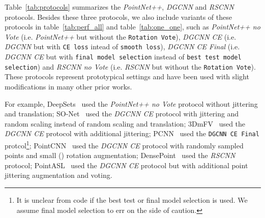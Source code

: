 \documentclass{article}
\begin{document}
Table~\ref{tab:protocols} summarizes the \textit{PointNet++}, \textit{DGCNN} and \textit{RSCNN} protocols. Besides these three protocols, we also include variants of these protocols in table~\ref{tab:perf_all} and table~\ref{tab:one_one}, such as \textit{PointNet++ no Vote} (i.e. \textit{PointNet++} but without the \texttt{Rotation Vote}), \textit{DGCNN CE} (i.e. \textit{DGCNN} but with \texttt{CE loss} intead of \texttt{smooth loss}), \textit{DGCNN CE Final} (i.e. \textit{DGCNN CE} but with \texttt{final model selection} instead of \texttt{best test model selection}) and \textit{RSCNN no Vote} (i.e. \textit{RSCNN} but without the \texttt{Rotation Vote}). These protocols represent prototypical settings and have been used with slight modifications in many other prior works. 

For example, DeepSets~\citep{zaheer-deepsets-nips17} used the \textit{PointNet++ no Vote} protocol without jittering and translation; SO-Net~\citep{li-sonet-cvpr18} used the \textit{DGCNN CE} protocol with jittering and random scaling instead of random scaling and translation; 3DmFV~\citep{ben20183dmfv} used the \textit{DGCNN CE} protocol with additional jittering; PCNN~\citep{atzmon2018point} used the \texttt{DGCNN CE Final} protcol\footnote{It is unclear from code if the best test or final model selection is used. We assume final model selection to err on the side of caution.}; PointCNN~\citep{li-pointcnn-ar18} used the \textit{DGCNN CE} protocol with randomly sampled points and small () rotation augmentation; DensePoint~\citep{liu2019densepoint} used the \textit{RSCNN} protocol; PointASL~\citep{yan2020pointasnl} used the \textit{DGCNN CE} protocol but with additional point jittering augmentation and voting.
\end{document}
